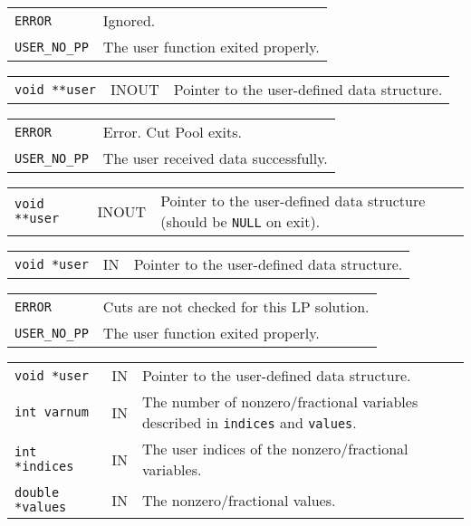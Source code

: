 \documentclass[twoside,11pt]{article}
\begin{document}
{\newpage
\clearpage
\samepage \begin{tabular}{lp{365.945pt}}
{\tt ERROR} & Ignored. \\ 
{\tt USER\_NO\_PP} & The user function exited properly. \\ 
\end{tabular}
}

{\newpage
\clearpage
\samepage \begin{tabular}{llp{313.615pt}}
{\tt void **user} & INOUT & Pointer to the user-defined data structure. \\ 
\end{tabular}
}

{\newpage
\clearpage
\samepage \begin{tabular}{lp{365.945pt}}
{\tt ERROR} & Error. Cut Pool exits. \\ 
{\tt USER\_NO\_PP} & The user received data successfully. \\ 
\end{tabular}
}

{\newpage
\clearpage
\samepage \begin{tabular}{llp{313.615pt}}
{\tt void **user} & INOUT & Pointer to the user-defined data structure
(should be {\tt NULL} on exit). \\ 
\end{tabular}
}

{\newpage
\clearpage
\samepage \begin{tabular}{llp{313.635pt}}
{\tt void *user} & IN & Pointer to the user-defined data structure. \\ 
\end{tabular}
}

{\newpage
\clearpage
\samepage \begin{tabular}{lp{365.945pt}}
{\tt ERROR} & Cuts are not checked for this LP solution. \\ 
{\tt USER\_NO\_PP} & The user function exited properly. \\ 
\end{tabular}
}

{\newpage
\clearpage
\samepage \begin{tabular}{llp{301.645pt}}
{\tt void *user} & IN & Pointer to the user-defined data structure. \\ 
{\tt int varnum} & IN & The number of nonzero/fractional variables described
in {\tt indices} and {\tt values}. \\ 
{\tt int *indices} & IN & The user indices of the nonzero/fractional
variables. \\ 
{\tt double *values} & IN & The nonzero/fractional values. \\  
\end{tabular}
}
\end{document}
